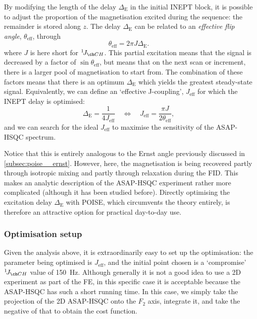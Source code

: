By modifying the length of the delay $\Delta_\text{E}$ in the initial INEPT block, it is possible to adjust the proportion of the  magnetisation excited during the sequence: the remainder is stored along $z$.
The delay $\Delta_\text{E}$ can be related to an \textit{effective flip angle}, $\theta_\text{eff}$, through
\begin{equation}
    \label{eq:asaphsqc_ernst_angle}
    \theta_\text{eff} = 2\pi J \Delta_\text{E}.
\end{equation}
where $J$ is here short for $\oneJ{CH}$.
This partial excitation means that the signal is decreased by a factor of $\sin\theta_\text{eff}$, but means that on the next scan or increment, there is a larger pool of  magnetisation to start from.
The combination of these factors means that there is an optimum $\Delta_\text{E}$ which yields the greatest steady-state signal.
Equivalently, we can define an `effective J-coupling', $J_\text{eff}$ for which the INEPT delay is optimised:
\begin{equation}
    \label{eq:asaphsqc_j_eff}
    \Delta_\text{E} = \frac{1}{4 J_\text{eff}} \quad\Longleftrightarrow\quad J_\text{eff} = \frac{\pi J}{2\theta_\text{eff}},
\end{equation}
and we can search for the ideal $J_\text{eff}$ to maximise the sensitivity of the ASAP-HSQC spectrum.

Notice that this is entirely analogous to the Ernst angle previously discussed in \cref{subsec:poise__ernst}.
However, here, the magnetisation is being recovered partly through isotropic mixing and partly through relaxation during the FID.
This makes an analytic description of the ASAP-HSQC experiment rather more complicated (although it has been studied before\autocite{Koos2019JMR}).
Directly optimising the excitation delay $\Delta_\text{E}$ with POISE, which circumvents the theory entirely, is therefore an attractive option for practical day-to-day use.


\subsubsection{Optimisation setup}

Given the analysis above, it is extraordinarily easy to set up the optimisation: the parameter being optimised is $J_\text{eff}$, and the initial point chosen is a `compromise' $\oneJ{CH}$ value of \qty{150}{\Hz}.
Although generally it is not a good idea to use a 2D experiment as part of the FE, in this specific case it is acceptable because the ASAP-HSQC has such a short running time.
In this case, we simply take the projection of the 2D ASAP-HSQC onto the $F_2$ axis, integrate it, and take the negative of that to obtain the cost function.

